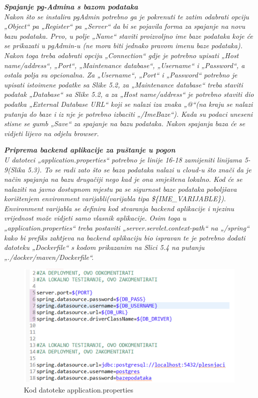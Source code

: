     	\textbf{\textit{Spajanje pg-Admina s bazom podataka}}\\
		    \textit{Nakon što se instalira pgAdmin potrebno ga je pokrenuti te zatim odabrati opciju „Object“ pa „Register“ pa „Server“ da bi se pojavila forma za spajanje na novu bazu podataka. Prvo,  u polje „Name“ staviti proizvoljno ime baze podataka koje će se prikazati u pgAdmin-u (ne mora biti jednako pravom imenu baze podataka). Nakon toga treba odabrati opciju „Connection“ gdje je potrebno upisati „Host name/address“, „Port“, „Maintenance database“, „Username“ i „Password“, a ostala polja su opcionalna. Za „Username“, „Port“ i „Password“ potrebno je upisati istoimene podatke sa Slike 5.2, za „Maintenance database“ treba staviti podatak „Database“ sa Slike 5.2, a za „Host name/address“ je potrebno staviti dio podatka „External Database URL“ koji se nalazi iza znaka „@“(na kraju se nalazi putanja do baze i iz nje je potrebno izbaciti „/ImeBaze“). Kada su podaci uneseni stisne se gumb „Save“ za spajanje na bazu podataka. Nakon spajanja baza će se vidjeti lijevo na odjelu browser.}
		    
		    \newpage
		 \textbf{\textit{Priprema backend aplikacije za puštanje u pogon}}\\
		 	\textit{U datoteci „application.properties“ potrebno je linije 16-18 zamijeniti linijama 5-9(Slika 5.3). To se radi zato što se baza podataka nalazi u cloud-u što znači da je način spajanja na bazu drugačiji nego kad je ona smještena lokalno. Kod će se nalaziti na javno dostupnom mjestu pa se sigurnost baze podataka poboljšava korištenjem environment varijabli(varijabla tipa \$\{IME\_VARIJABLE\}). Environment varijabla se definira kod stvaranja backend aplikacije i njezinu vrijednost može vidjeti samo vlasnik aplikacije. Osim toga u „application.properties“ treba postaviti „server.servlet.context-path“ na „/spring“ kako bi prefiks zahtjeva na backend aplikaciju bio ispravan te je potrebno dodati datoteku „Dockerfile“ s kodom prikazanim na Slici 5.4 na putanju „./docker/maven/Dockerfile“.}
		   \bigskip
		   \bigskip
         
         \begin{figure}[H]
         	\centering
         	\includegraphics[width=\textwidth]{slike/deployment/slika2.png}
         	\caption{Kod datoteke application.properties}
         	\label{fig:my_label}
         \end{figure}
     
